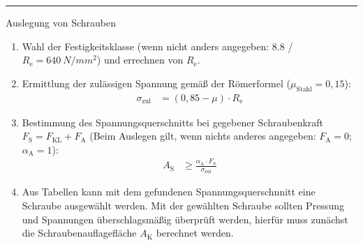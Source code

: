 \hrule
\begin{eeqn}{Auslegung von Schrauben}
	\begin{enumerate}[itemsep=0mm,leftmargin=12pt]
		\item Wahl der Festigkeitsklasse (wenn nicht anders angegeben: 8.8 / $R_\text{e}=\SI{640}{N/mm^2}$) und errechnen von $R_\text{e}$.
		\item Ermittlung der zulässigen Spannung gemäß der Römerformel ($\mu_\text{Stahl}=0,15$):
			\begin{align}
				\sigma_\text{zul} &= (0,85-\mu)\cdot R_\text{e}
			\end{align}
		\item Bestimmung des Spannungsquerschnitts bei gegebener Schraubenkraft $F_\text{S}=F_\text{KL}+F_\text{A}$ (Beim Auslegen gilt, wenn nichts anderes angegeben: $F_\text{A}=0$; $\alpha_\text{A}=1$):
			\begin{align}
				A_\text{S} &\geq \frac{\alpha_\text{A} \cdot F_\text{S}}{\sigma_\text{zul}}
			\end{align}
		\item Aus Tabellen kann mit dem gefundenen Spannungsquerschnnitt eine Schraube ausgewählt werden. Mit der gewählten Schraube sollten Pressung und Spannungen überschlagsmäßig überprüft werden, hierfür muss zunächst die Schraubenauflagefläche $A_\text{K}$ berechnet werden.
	\end{enumerate}
\end{eeqn}